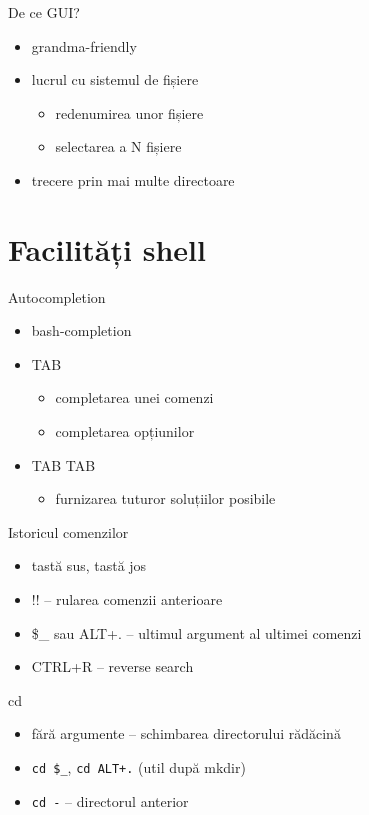 \documentclass{beamer}
\begin{document}
\begin{frame}{De ce GUI?}
	\begin{itemize}
		\item grandma-friendly
		\item lucrul cu sistemul de fișiere
			\begin{itemize}
				\item redenumirea unor fișiere
				\item selectarea a N fișiere
			\end{itemize}
		\item trecere prin mai multe directoare
	\end{itemize}
\end{frame}

\section{Facilități shell}

\begin{frame}{Autocompletion}
	\begin{itemize}
		\item bash-completion
		\item TAB
			\begin{itemize}
				\item completarea unei comenzi
				\item completarea opțiunilor
			\end{itemize}
		\item TAB TAB
			\begin{itemize}
				\item furnizarea tuturor soluțiilor posibile
			\end{itemize}
	\end{itemize}
\end{frame}

\begin{frame}{Istoricul comenzilor}
	\begin{itemize}
		\item tastă sus, tastă jos
		\item !! -- rularea comenzii anterioare
		\item \$\_ sau ALT+. -- ultimul argument al ultimei comenzi
		\item CTRL+R -- reverse search
	\end{itemize}
\end{frame}

\begin{frame}{cd}
	\begin{itemize}
		\item fără argumente -- schimbarea directorului rădăcină
		\item \texttt{cd \$\_}, \texttt{cd ALT+.} (util după mkdir)
		\item \texttt{cd -} -- directorul anterior
	\end{itemize}
\end{frame}
\end{document}
